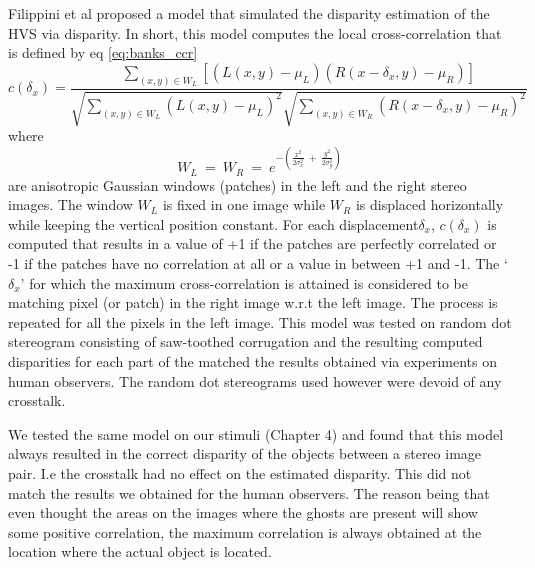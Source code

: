 Filippini et al \cite{filippini2009limits} proposed a model that simulated the disparity estimation of the HVS via disparity. In short, this model computes the local cross-correlation that is defined by eq \ref{eq:banks_ccr}
\begin{equation}
c(\delta_x) = \frac{ \sum\limits_{(x,y) \in W_L} [(L(x,y) - \mu_L)(R(x-\delta_x, y) - \mu_R)] }{\sqrt{\sum\limits_{(x,y) \in W_L}(L(x,y) - \mu_L)^2} \sqrt{\sum\limits_{(x,y) \in W_R}(R(x-\delta_x, y)- \mu_R)^2}}
\label{eq:banks_ccr}
\end{equation}
where
\begin{equation}
W_L \:=\: W_R \:=\: e^{-\left(\frac{x^2}{2\sigma_x^2} \:+\: \frac{y^2}{2\sigma_y^2}\right)}
\label{ccr_windows}
\end{equation}
are anisotropic Gaussian windows (patches) in the left and the right stereo images. The window $W_L$ is fixed in one image while $W_R$ is displaced horizontally while keeping the vertical position constant. For each displacement$\delta_x$, $c(\delta_x)$ is computed that results in a value of +1 if the patches are perfectly correlated or -1 if the patches have no correlation at all or a value in between +1 and -1. The `$\delta_x$' for which the maximum cross-correlation is attained is considered to be matching pixel (or patch) in the right image w.r.t the left image. The process is repeated for all the pixels in the left image. This model was tested on random dot stereogram consisting of saw-toothed corrugation and the resulting computed disparities for each part of the matched the results obtained via experiments on human observers. The random dot stereograms used however were devoid of any crosstalk.

We tested the same model on our stimuli (Chapter 4) and found that this model always resulted in the correct disparity of the objects between a stereo image pair. I.e the crosstalk had no effect on the estimated disparity. This did not match the results we obtained for the human observers. The reason being that even thought the areas on the images where the ghosts are present will show some positive correlation, the maximum correlation is always obtained at the location where the actual object is located.

